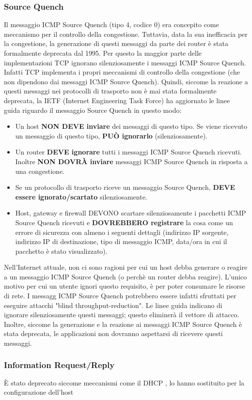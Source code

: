 \subsubsection*{Source Quench} 
Il messaggio ICMP Source Quench (tipo 4, codice 0) era concepito come meccanismo per il controllo della congestione. 
Tuttavia, data la sua inefficacia per la congestione, la generazione di questi messaggi da parte dei router è 
stata formalmente deprecata dal 1995. %
Per questo la maggior parte delle implementazioni TCP ignorano silenziosamente i messaggi ICMP Source Quench. 
Infatti TCP implementa i propri meccanismi di controllo della congestione (che non dipendono dai messaggi ICMP Source Quench). 
\vspace{1ex} \newline 
Quindi, siccome la reazione a questi messaggi nei protocolli di trasporto non è mai stata formalmente deprecata, 
la IETF (Internet Engineering Task Force) ha aggiornato le linee guida riguardo il messaggio Source Quench in questo modo:  
\begin{itemize}
    \item Un host \textbf{NON DEVE inviare} dei messaggi di questo tipo. 
    Se viene ricevuto un messaggio di questo tipo, \textbf{PUÒ ignorarlo} (silenziosamente). 
    \item Un router \textbf{DEVE ignorare} tutti i messaggi ICMP Source Quench ricevuti. 
    Inoltre \textbf{NON DOVR\uppercase{à} inviare} messaggi ICMP Source Quench in risposta a una congestione. 
    \item Se un protocollo di trasporto riceve un messaggio Source Quench, \textbf{DEVE essere ignorato/scartato} silenziosamente. 
    \item Host, gateway e firewall DEVONO scartare silenziosamente i pacchetti ICMP Source Quench 
    ricevuti e \textbf{DOVREBBERO registrare} la cosa come un errore di sicurezza con almeno i seguenti dettagli 
    (indirizzo IP sorgente, indirizzo IP di destinazione, tipo di messaggio ICMP, data/ora in cui il pacchetto 
    è stato visualizzato). 
\end{itemize} 
Nell'Internet attuale, non ci sono ragioni per cui un host debba generare o reagire a un messaggio ICMP Source Quench %
(o perchè un router debba reagire).  
L'unico motivo per cui un utente ignori questo requisito, è per poter consumare le risorse di rete. %
I messagg ICMP Source Quench potrebbero essere infatti sfruttati per eseguire attacchi "blind throughput-reduction". 
Le linee guida indicano di ignorare silenziosamente questi messaggi; questo eliminerà il vettore di attacco. 
\vspace{1ex} \newline 
Inoltre, siccome la generazione e la reazione ai messaggi ICMP Source Quench è stata deprecata, le applicazioni 
non dovranno aspettarsi di ricevere questi messaggi. 

\subsubsection*{Information Request/Reply} 
\uppercase{è} stato deprecato siccome meccanismi come il DHCP \cite{rfc2131_DHCP}, lo hanno sostituito per la configurazione dell'host
